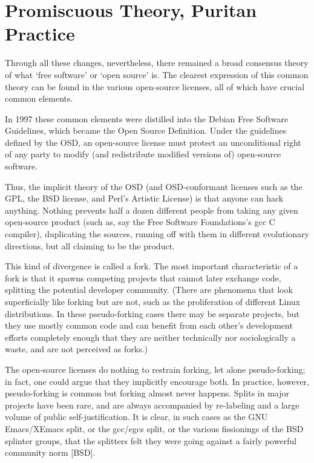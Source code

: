 \section{Promiscuous Theory, Puritan Practice}

Through all these changes, nevertheless, there remained a broad consensus theory
of what `free software' or `open source' is.  The clearest expression of this
common theory can be found in the various open-source licenses, all of which
have crucial common elements.

In 1997 these common elements were distilled into the Debian Free Software
Guidelines, which became the Open Source Definition.  Under the guidelines
defined by the OSD, an open-source license must protect an unconditional right
of any party to modify (and redistribute modified versions of) open-source
software.

Thus, the implicit theory of the OSD (and OSD-conformant licenses such as the
GPL, the BSD license, and Perl's Artistic License) is that anyone can hack
anything.  Nothing prevents half a dozen different people from taking any given
open-source product (such as, say the Free Software Foundations's gcc C
compiler), duplicating the sources, running off with them in different
evolutionary directions, but all claiming to be the product.

This kind of divergence is called a fork.  The most important characteristic of
a fork is that it spawns competing projects that cannot later exchange code,
splitting the potential developer community.  (There are phenomena that look
superficially like forking but are not, such as the proliferation of different
Linux distributions.  In these pseudo-forking cases there may be separate
projects, but they use mostly common code and can benefit from each other's
development efforts completely enough that they are neither technically nor
sociologically a waste, and are not perceived as forks.)

The open-source licenses do nothing to restrain forking, let alone
pseudo-forking; in fact, one could argue that they implicitly encourage both.
In practice, however, pseudo-forking is common but forking almost never happens.
Splits in major projects have been rare, and are always accompanied by
re-labeling and a large volume of public self-justification.  It is clear, in
such cases as the GNU Emacs/XEmacs split, or the gcc/egcs split, or the various
fissionings of the BSD splinter groups, that the splitters felt they were going
against a fairly powerful community norm [BSD].

